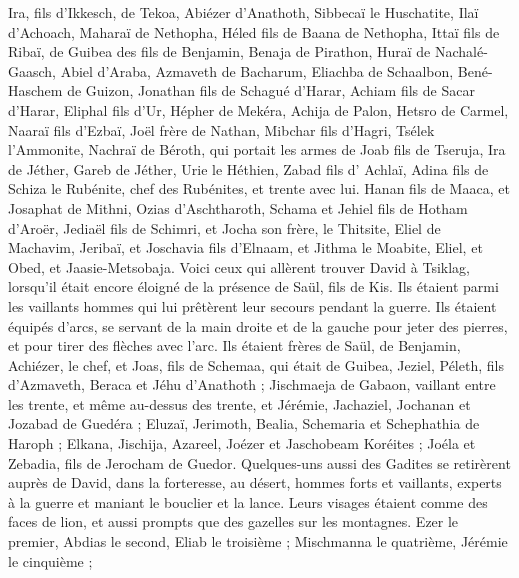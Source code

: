 \begin{multicols}{2}
Ira, fils d'Ikkesch, de Tekoa, Abiézer d'Anathoth,
Sibbecaï le Huschatite, Ilaï d'Achoach,
Maharaï de Nethopha, Héled fils de Baana de Nethopha,
Ittaï fils de Ribaï, de Guibea des fils de Benjamin, Benaja de Pirathon,
Huraï de Nachalé-Gaasch, Abiel d'Araba,
Azmaveth de Bacharum, Eliachba de Schaalbon,
Bené-Haschem de Guizon, Jonathan fils de Schagué d'Harar,
Achiam fils de Sacar d'Harar, Eliphal fils d'Ur,
Hépher de Mekéra, Achija de Palon,
Hetsro de Carmel, Naaraï fils d'Ezbaï,
Joël frère de Nathan, Mibchar fils d'Hagri,
Tsélek l'Ammonite, Nachraï de Béroth, qui portait les armes de Joab fils de Tseruja,
Ira de Jéther, Gareb de Jéther,
Urie le Héthien, Zabad fils d' Achlaï,
Adina fils de Schiza le Rubénite, chef des Rubénites, et trente avec lui.
Hanan fils de Maaca, et Josaphat de Mithni,
Ozias d'Aschtharoth, Schama et Jehiel fils de Hotham d'Aroër,
Jediaël fils de Schimri, et Jocha son frère, le Thitsite,
Eliel de Machavim, Jeribaï, et Joschavia fils d'Elnaam, et Jithma le Moabite,
Eliel, et Obed, et Jaasie-Metsobaja.
\VerseOne{}Voici ceux qui allèrent trouver David à Tsiklag, lorsqu'il était encore éloigné de la présence de Saül, fils de Kis. Ils étaient parmi les vaillants hommes qui lui prêtèrent leur secours pendant la guerre.
Ils étaient équipés d'arcs, se servant de la main droite et de la gauche pour jeter des pierres, et pour tirer des flèches avec l'arc. Ils étaient frères de Saül, de Benjamin,
Achiézer, le chef, et Joas, fils de Schemaa, qui était de Guibea, Jeziel, Péleth, fils d'Azmaveth, Beraca et Jéhu d'Anathoth ;
Jischmaeja de Gabaon, vaillant entre les trente, et même au-dessus des trente, et Jérémie, Jachaziel, Jochanan et Jozabad de Guedéra ;
Eluzaï, Jerimoth, Bealia, Schemaria et Schephathia de Haroph ;
Elkana, Jischija, Azareel, Joézer et Jaschobeam Koréites ;
Joéla et Zebadia, fils de Jerocham de Guedor.
Quelques-uns aussi des Gadites se retirèrent auprès de David, dans la forteresse, au désert, hommes forts et vaillants, experts à la guerre et maniant le bouclier et la lance. Leurs visages étaient comme des faces de lion, et aussi prompts que des gazelles sur les montagnes.
Ezer le premier, Abdias le second, Eliab le troisième ;
Mischmanna le quatrième, Jérémie le cinquième ;

\end{multicols}
